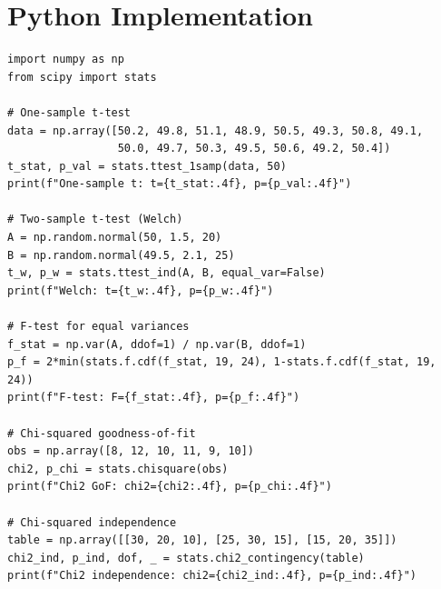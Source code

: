 \begin{center}
\end{center}

\section{Python Implementation}

\begin{python}
\begin{verbatim}
import numpy as np
from scipy import stats

# One-sample t-test
data = np.array([50.2, 49.8, 51.1, 48.9, 50.5, 49.3, 50.8, 49.1,
                 50.0, 49.7, 50.3, 49.5, 50.6, 49.2, 50.4])
t_stat, p_val = stats.ttest_1samp(data, 50)
print(f"One-sample t: t={t_stat:.4f}, p={p_val:.4f}")

# Two-sample t-test (Welch)
A = np.random.normal(50, 1.5, 20)
B = np.random.normal(49.5, 2.1, 25)
t_w, p_w = stats.ttest_ind(A, B, equal_var=False)
print(f"Welch: t={t_w:.4f}, p={p_w:.4f}")

# F-test for equal variances
f_stat = np.var(A, ddof=1) / np.var(B, ddof=1)
p_f = 2*min(stats.f.cdf(f_stat, 19, 24), 1-stats.f.cdf(f_stat, 19, 24))
print(f"F-test: F={f_stat:.4f}, p={p_f:.4f}")

# Chi-squared goodness-of-fit
obs = np.array([8, 12, 10, 11, 9, 10])
chi2, p_chi = stats.chisquare(obs)
print(f"Chi2 GoF: chi2={chi2:.4f}, p={p_chi:.4f}")

# Chi-squared independence
table = np.array([[30, 20, 10], [25, 30, 15], [15, 20, 35]])
chi2_ind, p_ind, dof, _ = stats.chi2_contingency(table)
print(f"Chi2 independence: chi2={chi2_ind:.4f}, p={p_ind:.4f}")
\end{verbatim}
\end{python}

